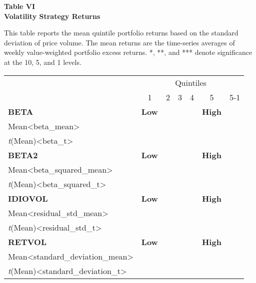 \documentclass{article}
\begin{document}
    \begin{center}
        \textbf{
        Table VI
        \\
        Volatility Strategy Returns
        }
        \begin{justify}
            \footnotesize{
                This table reports the mean quintile portfolio returns based on the standard deviation of price volume. The mean returns are the time-series averages of weekly value-weighted portfolio excess returns. *, **, and *** denote significance at the 10, 5, and 1 levels.
            }
        \end{justify}
        \-
        \begin{tabular}{lcccccr}
            \toprule
            \multicolumn{1}{c}{} & \multicolumn{6}{c}{Quintiles}
            \\
            \cmidrule(lr){2-7}
            & 1 & 2 & 3 & 4 & 5 & 5-1
            \\
            \midrule
            \multicolumn{1}{l}{\textbf{BETA}} & \multicolumn{1}{c}{\textbf{Low}} & \multicolumn{3}{c}{} & \multicolumn{1}{c}{\textbf{High}}
            \\
            Mean<beta_mean>
            \\
            \textit{t}(Mean)<beta_t>
            \\ [0.2cm]
            \multicolumn{1}{l}{\textbf{BETA2}} & \multicolumn{1}{c}{\textbf{Low}} & \multicolumn{3}{c}{} & \multicolumn{1}{c}{\textbf{High}}
            \\
            Mean<beta_squared_mean>
            \\
            \textit{t}(Mean)<beta_squared_t>
            \\ [0.2cm]
            \multicolumn{1}{l}{\textbf{IDIOVOL}} & \multicolumn{1}{c}{\textbf{Low}} & \multicolumn{3}{c}{} & \multicolumn{1}{c}{\textbf{High}}
            \\
            Mean<residual_std_mean>
            \\
            \textit{t}(Mean)<residual_std_t>
            \\ [0.2cm]
            \multicolumn{1}{l}{\textbf{RETVOL}} & \multicolumn{1}{c}{\textbf{Low}} & \multicolumn{3}{c}{} & \multicolumn{1}{c}{\textbf{High}}
            \\
            Mean<standard_deviation_mean>
            \\
            \textit{t}(Mean)<standard_deviation_t>
            \\ [0.2cm]

\end{tabular}
\end{center}
\end{document}
